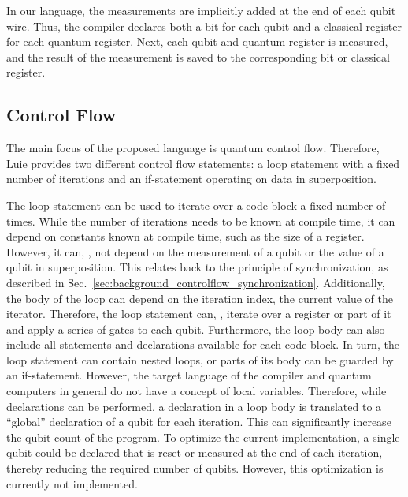 In our language, the measurements are implicitly added at the end of each qubit wire. Thus, the compiler declares both a bit for each qubit and a classical register for each quantum register. Next, each qubit and quantum register is measured, and the result of the measurement is saved to the corresponding bit or classical register.

\subsection{Control Flow}
\label{sec:concept_controlFlow}
The main focus of the proposed language is quantum control flow. Therefore, Luie provides two different control flow statements: a loop statement with a fixed number of iterations and an if-statement operating on data in superposition. 

The loop statement can be used to iterate over a code block a fixed number of times. While the number of iterations needs to be known at compile time, it can depend on constants known at compile time, such as the size of a register. However, it can, \eg, not depend on the measurement of a qubit or the value of a qubit in superposition. This relates back to the principle of synchronization, as described in Sec.~\ref{sec:background_controlflow_synchronization}. Additionally, the body of the loop can depend on the iteration index, \ie the current value of the iterator. Therefore, the loop statement can, \eg, iterate over a register or part of it and apply a series of gates to each qubit. Furthermore, the loop body can also include all statements and declarations available for each code block. In turn, the loop statement can contain nested loops, or parts of its body can be guarded by an if-statement. However, the target language of the compiler and quantum computers in general do not have a concept of local variables. Therefore, while declarations can be performed, a declaration in a loop body is translated to a ``global'' declaration of a qubit for each iteration. This can significantly increase the qubit count of the program. To optimize the current implementation, a single qubit could be declared that is reset or measured at the end of each iteration, thereby reducing the required number of qubits. However, this optimization is currently not implemented.

